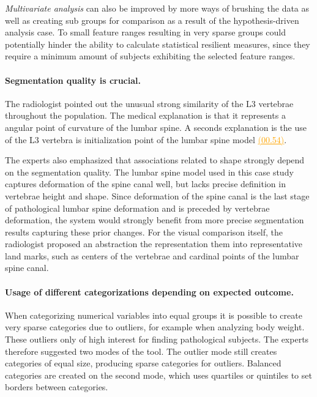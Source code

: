 \documentclass[journal]{style/vgtc} 			          %
\newcommand{\com}[1]{\textcolor{orange}{\uline{#1}}}
\begin{document}
\emph{Multivariate analysis} can also be improved by more ways of brushing the data as well as creating sub groups for comparison as a result of the hypothesis-driven analysis case.
%
To small feature ranges resulting in very sparse groups could potentially hinder the ability to calculate statistical resilient measures, since they require a minimum amount of subjects exhibiting the selected feature ranges.
%

\paragraph{Segmentation quality is crucial.}
The radiologist pointed out the unusual strong similarity of the L3 vertebrae throughout the population.
%
The medical explanation is that it represents a angular point of curvature of the lumbar spine.
%
A seconds explanation is the use of the L3 vertebra is initialization point of the lumbar spine model \com{(00.54)}.

The experts also emphasized that associations related to shape strongly depend on the segmentation quality.
%
The lumbar spine model used in this case study captures deformation of the spine canal well, but lacks precise definition in vertebrae height and shape.
%
Since deformation of the spine canal is the last stage of pathological lumbar spine deformation and is preceded by vertebrae deformation, the system would strongly benefit from more precise segmentation results capturing these prior changes.
%
For the visual comparison itself, the radiologist proposed an abstraction the representation them into representative land marks, such as centers of the vertebrae and cardinal points of the lumbar spine canal.

\paragraph{Usage of different categorizations depending on expected outcome.}
When categorizing numerical variables into equal groups it is possible to create very sparse categories due to outliers, for example when analyzing body weight.
%
These outliers only of high interest for finding pathological subjects. %
%
The experts therefore suggested two modes of the tool.
%
The outlier mode still creates categories of equal size, producing sparse categories for outliers.
%
Balanced categories are created on the second mode, which uses quartiles or quintiles to set borders between categories.
\end{document}
